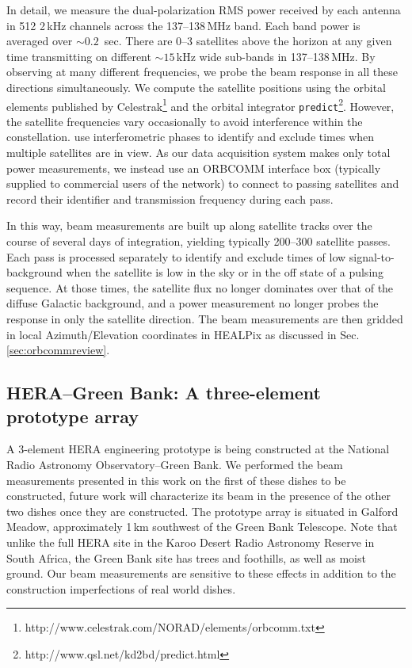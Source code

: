 \documentclass{emulateapj}
\begin{document}
In detail, we measure the dual-polarization RMS power received by each antenna in 512 2\,kHz 
channels across the 137--138\,MHz band. Each band power is averaged over $\sim0.2$
\,sec. There are 0--3 satellites above the horizon at any given time transmitting on different 
$\sim15$\,kHz wide sub-bands in 137--138\,MHz. By observing at many different 
frequencies, we probe the beam response in all these directions simultaneously. We 
compute the satellite positions using the orbital elements published by Celestrak\footnote{http://www.celestrak.com/NORAD/elements/orbcomm.txt} and the orbital 
integrator \texttt{predict}\footnote{http://www.qsl.net/kd2bd/predict.html}. However, the 
satellite frequencies vary occasionally to avoid interference within the constellation. 
\citet{zheng14} use interferometric phases to identify and exclude times when multiple 
satellites are in view. As our data acquisition system makes only total power 
measurements, we instead use an ORBCOMM interface box (typically supplied to 
commercial users of the network) to connect to passing satellites and record their identifier 
and transmission frequency during each pass.

In this way, beam measurements are built up along satellite tracks over the course of 
several days of integration, yielding typically 200--300 satellite passes. Each pass is 
processed separately to identify and exclude times of low signal-to-background when the 
satellite is low in the sky or in the off state of a pulsing sequence. At those times, the 
satellite flux no longer dominates over that of the diffuse Galactic background, and a 
power measurement no longer probes the response in only the satellite direction. The beam 
measurements are then gridded in local Azimuth/Elevation coordinates in HEALPix \citep{healpix} as discussed in Sec. \ref{sec:orbcommreview}.


\subsection{HERA--Green Bank: A three-element prototype array}

A 3-element HERA engineering prototype is being constructed at the National Radio 
Astronomy Observatory--Green Bank. We performed the beam measurements presented in 
this work on the first of these dishes to be constructed, future work will characterize its beam in the presence of the other two dishes once they are constructed. The prototype array is situated in Galford Meadow, approximately 1\,km southwest of the Green Bank Telescope. Note that unlike the full HERA site in the Karoo Desert Radio Astronomy Reserve in 
South Africa, the Green Bank site has trees and foothills, as well as moist ground. Our beam measurements
are sensitive to these effects in addition to the construction imperfections of real world dishes.
\end{document}
